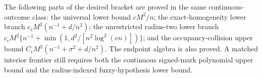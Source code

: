 The following parts of the desired bracket are proved in the same continuous-outcome class: the universal lower bound \(cM^2/n\); the exact-homogeneity lower branch \(c_{\epsilon}M^2(n^{-1}+d/n^2)\); the unrestricted radius-two lower branch \(c_{\epsilon}M^2\{n^{-1}+\min(1,d^2/[n^2\log^2(en)])\}\); and the occupancy-collision upper bound \(C_{\epsilon}M^2(n^{-1}+\sigma^2+d/n^2)\).  The endpoint algebra is also proved.  A matched interior frontier still requires both the continuous signed-mark polynomial upper bound and the radius-indexed fuzzy-hypothesis lower bound.